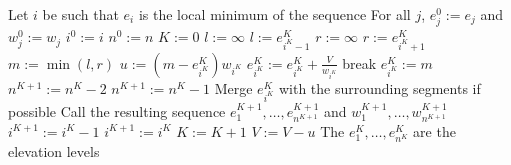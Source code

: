 \documentclass[11pt,a4paper]{article}
\begin{document}
\vspace{1em}

\begin{algorithmic}[1]
    \State Let $i$ be such that $e_i$ is the local minimum of the sequence\; \label{a1:minimum}
    \State For all $j$, $e_j^0 := e_j$ and $w_j^0 := w_j$
    \State $i^0 := i$
    \State $n^0 := n$
    \State $K := 0$
     \label{a1:while}
        \State $l := \infty$
            \State $l := e_{i^K-1}^K$
        \EndIf
        \State $r := \infty$
            \State $r := e_{i^K+1}^K$
        \EndIf
        \State $m := \min(l, r)$
        \State $u := (m-e_{i^K}^K)w_{i^K}$
         \label{a1:vleu}
            \State $e_{i^K}^K := e_{i^K}^K + \frac{V}{w_{i^K}}$ \label{a1:vplus}
            \State break \label{a1:break}
        \EndIf
        \State $e_{i^K}^K := m$ \label{a1:newe}
         \label{a1:leqr}
            \State $n^{K+1} := n^K - 2$ \label{a1:min2}
        \Else
            \State $n^{K+1} := n^K - 1$ \label{a1:min1}
        \EndIf
        \State Merge $e_{i^K}^K$ with the surrounding segments if possible \label{a1:merge}
        \State Call the resulting sequence $e_1^{K+1},\ldots,e_{n^{K+1}}^{K+1}$ and $w_1^{K+1},\ldots,w_{n^{K+1}}^{K+1}$
         \label{a1:ller}
            \State $i^{K+1} := i^K - 1$ \label{a1:imin1}
        \Else
            \State $i^{K+1} := i^K$ \label{a1:imin0}
        \EndIf
        \State $K := K + 1$
        \State $V := V - u$
    \EndWhile
    \State The $e_1^K,\ldots,e_{n^K}^K$ are the elevation levels
\end{algorithmic}
\end{document}
